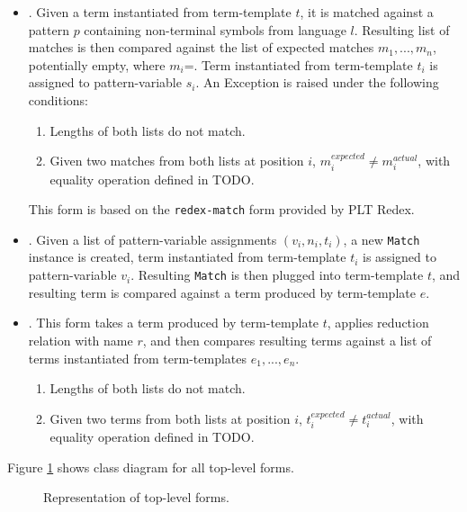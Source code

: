 \begin{itemize}
\item \RedexMatchAssertEqual. Given a term instantiated from term-template $t$, it is matched against a pattern $p$ containing non-terminal symbols from language $l$. Resulting list of matches is then compared against the list of expected matches $m_1,...,m_n$, potentially empty, where $m_i$=\Match. Term instantiated from term-template $t_i$ is assigned to pattern-variable $s_i$. An Exception is raised under the following conditions:
	\begin{enumerate}
	\item Lengths of both lists do not match.
	\item Given two matches from both lists at position $i$, $m_i^{expected} \neq m_i^{actual}$, with equality operation defined in TODO.
	\end{enumerate}
	This form is based on the \texttt{redex-match} form provided by PLT Redex.

\item \TermLetAssertEqual. Given a list of pattern-variable assignments $(v_i, n_i, t_i)$, a new \texttt{Match} instance is created, term instantiated from term-template $t_i$ is assigned to pattern-variable $v_i$. Resulting \texttt{Match} is then plugged into term-template $t$, and resulting term is compared against a term produced by term-template $e$.

\item \ApplyReductionRelationAssertEqual. This form takes a term produced by term-template $t$, applies reduction relation with name $r$, and then compares resulting terms against a list of terms instantiated from term-templates $e_1,...,e_n$.
	\begin{enumerate}
	\item Lengths of both lists do not match.
	\item Given two terms from both lists at position $i$, $t_i^{expected} \neq t_i^{actual}$, with equality operation defined in TODO.
	\end{enumerate}
\end{itemize}

Figure \ref{class-diagram-toplevel} shows class diagram for all top-level forms.

\begin{figure}[H]
	\centering
	\caption{Representation of top-level forms.}
\label{class-diagram-toplevel}
\end{figure}
